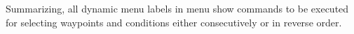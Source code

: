 Summarizing, all dynamic menu labels in menu  show commands to be 
executed for selecting waypoints and conditions either consecutively or in reverse 
order. 

  









